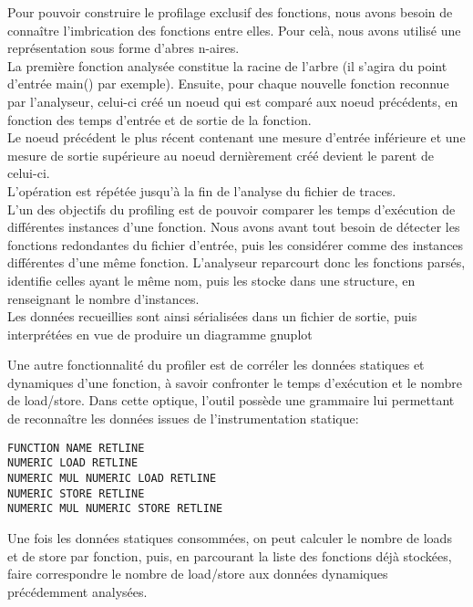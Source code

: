 \documentclass[oneside,11pt]{article}
\begin{document}
Pour pouvoir construire le profilage exclusif des fonctions, nous avons besoin de connaître l'imbrication des fonctions entre elles.
Pour celà, nous avons utilisé une représentation sous forme d'abres n-aires.\\
La première fonction analysée constitue la racine de l'arbre (il s'agira du point d'entrée main() par exemple). Ensuite, pour chaque nouvelle fonction reconnue par l'analyseur, celui-ci créé un noeud qui est comparé aux noeud précédents, en fonction des temps d'entrée et de sortie de la fonction.\\
Le noeud précédent le plus récent contenant une mesure d'entrée inférieure et une mesure de sortie supérieure au noeud dernièrement créé devient le parent de celui-ci.\\

L'opération est répétée jusqu'à la fin de l'analyse du fichier de traces.\\

L'un des objectifs du profiling est de pouvoir comparer les temps d'exécution de différentes instances d'une fonction. Nous avons avant tout besoin de détecter les fonctions redondantes du fichier d'entrée, puis les considérer comme des instances différentes d'une même fonction.
L'analyseur reparcourt donc les fonctions parsés, identifie celles ayant le même nom, puis les stocke dans une structure, en renseignant le nombre d'instances.\\
Les données recueillies sont ainsi sérialisées dans un fichier de sortie, puis interprétées en vue de produire un diagramme gnuplot 



Une autre fonctionnalité du profiler est de corréler les données statiques et dynamiques d'une fonction, à savoir confronter le temps d'exécution et le nombre de load/store. Dans cette optique, l'outil possède une grammaire lui permettant de reconnaître les données issues de l'instrumentation statique:

\begin{verbatim}
FUNCTION NAME RETLINE
NUMERIC LOAD RETLINE
NUMERIC MUL NUMERIC LOAD RETLINE
NUMERIC STORE RETLINE
NUMERIC MUL NUMERIC STORE RETLINE
\end{verbatim}

Une fois les données statiques consommées, on peut calculer le nombre de loads et de store par fonction, puis, en parcourant la liste des fonctions déjà stockées, faire correspondre le nombre de load/store aux données dynamiques précédemment analysées.\\
\end{document}
